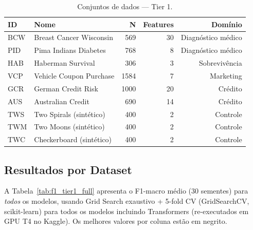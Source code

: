 \documentclass[12pt,a4paper]{article}
\begin{document}
\begin{table}[H]
\centering
\caption{Conjuntos de dados --- Tier 1.}
\label{tab:datasets}
\begin{tabular}{llrrr}
\toprule
\textbf{ID} & \textbf{Nome} & \textbf{N} & \textbf{Features} & \textbf{Domínio} \\
\midrule
BCW & Breast Cancer Wisconsin & 569 & 30 & Diagnóstico médico \\
PID & Pima Indians Diabetes   & 768 &  8 & Diagnóstico médico \\
HAB & Haberman Survival       & 306 &  3 & Sobrevivência \\
VCP & Vehicle Coupon Purchase &1584 &  7 & Marketing \\
GCR & German Credit Risk      &1000 & 20 & Crédito \\
AUS & Australian Credit       & 690 & 14 & Crédito \\
TWS & Two Spirals (sintético) & 400 &  2 & Controle \\
TWM & Two Moons (sintético)   & 400 &  2 & Controle \\
TWC & Checkerboard (sintético)& 400 &  2 & Controle \\
\bottomrule
\end{tabular}
\end{table}

\subsection{Resultados por Dataset}

A Tabela~\ref{tab:f1_tier1_full} apresenta o F1-macro médio (30 sementes) para
\emph{todos} os modelos, usando Grid Search exaustivo + 5-fold CV (GridSearchCV,
scikit-learn) para todos os modelos incluindo Transformers (re-executados em GPU
T4 no Kaggle). Os melhores valores por coluna estão em negrito.
\end{document}
